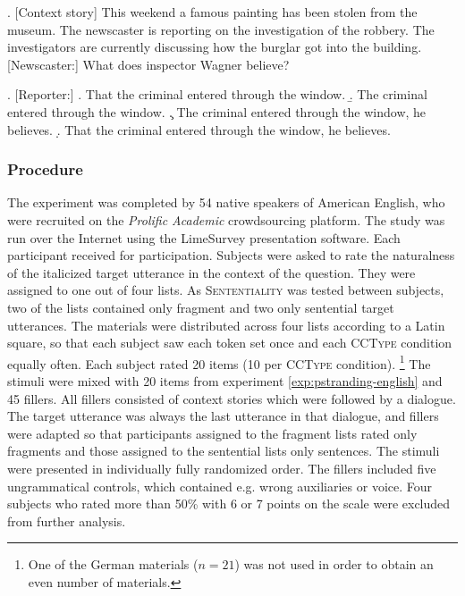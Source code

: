 \ex. [Context story] This weekend a famous painting has been stolen from the museum. The newscaster is reporting on the investigation of the robbery. The investigators are currently discussing how the burglar got into the building.\\\mbox{}[Newscaster:] What does inspector Wagner believe?\pagebreak


\ex. [Reporter:]
\a. That the criminal entered through the window.
\b. The criminal entered through the window.
\c. The criminal entered through the window, he believes.
\d. That the criminal entered through the window, he believes.

\subsubsection{Procedure}\label{sec:ccs-english-method}
The experiment was completed by 54 native speakers of American English, who were recruited on the \textit{Prolific Academic} crowdsourcing platform. The study was run over the Internet using the LimeSurvey presentation software. Each participant received  for participation. Subjects were asked to rate the naturalness of the italicized target utterance in the context of the question. They were assigned to one out of four lists. As \textsc{Sententiality} was tested between subjects, two of the lists contained only fragment and two only sentential target utterances. The materials were distributed across four lists according to a Latin square, so that each subject saw each token set once and each \textsc{CCType} condition equally often. 
Each subject rated 20 items (10 per \textsc{CCType} condition).%
%
\footnote{One of the German materials ($n=21$) was not used in order to obtain an even number of materials.}\afterfn%
%
The stimuli were mixed with 20 items from experiment \ref{exp:pstranding-english} and 45 fillers. All fillers consisted of context stories which were followed by a dialogue. The target utterance was always the last utterance in that dialogue, and fillers were adapted so that participants assigned to the fragment lists rated only fragments and those assigned to the sentential lists only sentences. The stimuli were presented in individually fully randomized order. The fillers included five ungrammatical controls, which contained e.g. wrong auxiliaries or voice. Four subjects who rated more than 50\% with 6 or 7 points on the scale were excluded from further analysis.

